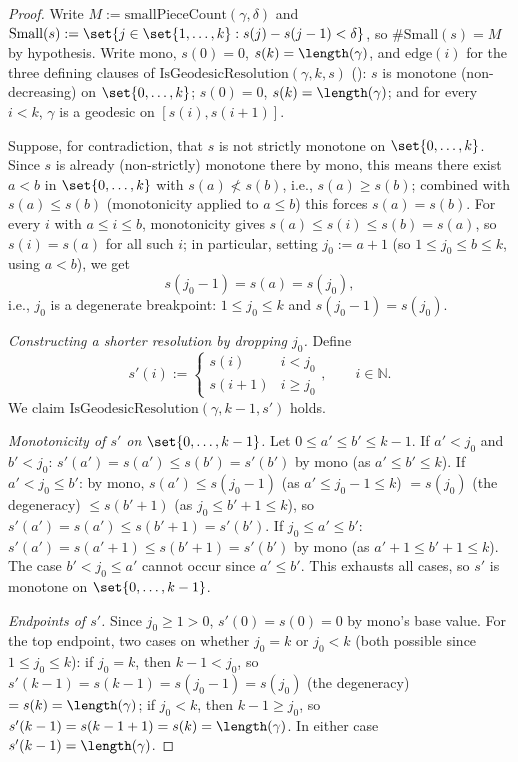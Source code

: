 \begin{proof}
  Write $M := \mathrm{smallPieceCount}(\gamma,\delta)$ and
  $\mathrm{Small}(s) := \set{j \in \set{1,\dots,k} : s(j)-s(j-1)<\delta}$, so
  $\#\mathrm{Small}(s) = M$ by hypothesis. Write $\mathrm{mono}$, $s(0)=0$, $s(k)=\length(\gamma)$,
  and $\mathrm{edge}(i)$ for the three defining clauses of
  $\mathrm{IsGeodesicResolution}(\gamma,k,s)$ (): $s$ is
  monotone (non-decreasing) on $\set{0,\dots,k}$; $s(0)=0$, $s(k)=\length(\gamma)$; and for every
  $i<k$, $\gamma$ is a geodesic on $[s(i),s(i+1)]$.

  Suppose, for contradiction, that $s$ is not strictly monotone on $\set{0,\dots,k}$. Since $s$ is
  already (non-strictly) monotone there by $\mathrm{mono}$, this means there exist $a<b$ in
  $\set{0,\dots,k}$ with $s(a) \not< s(b)$, i.e., $s(a) \geq s(b)$; combined with $s(a)\le s(b)$
  (monotonicity applied to $a\le b$) this forces $s(a) = s(b)$. For every $i$ with $a \le i \le b$,
  monotonicity gives $s(a) \le s(i) \le s(b) = s(a)$, so $s(i) = s(a)$ for all such $i$; in
  particular, setting $j_0 := a+1$ (so $1 \le j_0 \le b \le k$, using $a<b$), we get
  \[
    s(j_0-1) = s(a) = s(j_0)
    ,
  \]
  i.e., $j_0$ is a degenerate breakpoint: $1 \le j_0 \le k$ and $s(j_0-1)=s(j_0)$.

  \emph{Constructing a shorter resolution by dropping $j_0$.} Define
  \[
    s'(i) := \begin{cases} s(i) & i < j_0 \\ s(i+1) & i \ge j_0 \end{cases}
    ,\qquad i \in \mathbb{N}
    .
  \]
  We claim $\mathrm{IsGeodesicResolution}(\gamma,k-1,s')$ holds.

  \emph{Monotonicity of $s'$ on $\set{0,\dots,k-1}$.} Let $0 \le a' \le b' \le k-1$. If $a'<j_0$ and
  $b'<j_0$: $s'(a')=s(a') \le s(b')=s'(b')$ by $\mathrm{mono}$ (as $a'\le b' \le k$). If $a'<j_0 \le
  b'$: by $\mathrm{mono}$, $s(a') \le s(j_0-1)$ (as $a' \le j_0-1 \le k$) $= s(j_0)$ (the degeneracy)
  $\le s(b'+1)$ (as $j_0 \le b'+1 \le k$), so $s'(a')=s(a') \le s(b'+1)=s'(b')$. If $j_0 \le a' \le
  b'$: $s'(a')=s(a'+1) \le s(b'+1)=s'(b')$ by $\mathrm{mono}$ (as $a'+1\le b'+1\le k$). The case
  $b'<j_0\le a'$ cannot occur since $a'\le b'$. This exhausts all cases, so $s'$ is monotone on
  $\set{0,\dots,k-1}$.

  \emph{Endpoints of $s'$.} Since $j_0 \ge 1 > 0$, $s'(0) = s(0) = 0$ by $\mathrm{mono}$'s
  base value. For the top endpoint, two cases on whether $j_0 = k$ or $j_0<k$ (both possible since
  $1\le j_0\le k$): if $j_0=k$, then $k-1<j_0$, so $s'(k-1)=s(k-1)=s(j_0-1)=s(j_0)$ (the degeneracy)
  $=s(k)=\length(\gamma)$; if $j_0<k$, then $k-1 \ge j_0$, so $s'(k-1)=s(k-1+1)=s(k)=\length(\gamma)$.
  In either case $s'(k-1) = \length(\gamma)$.


\end{proof}
